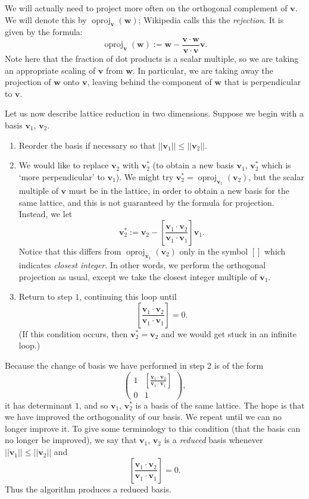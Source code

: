 \documentclass{article}
\theoremstyle{plain}
\theoremstyle{definition}
\theoremstyle{remark}
\numberwithin{theorem}{section}
\begin{document}
We will actually need to project more often on the orthogonal complement of $\mathbf{v}$.  We will denote this by $\operatorname{oproj}_\mathbf{v}(\mathbf{w})$; Wikipedia calls this the \emph{rejection}.  It is given by the formula:
\[
\operatorname{oproj}_\mathbf{v}(\mathbf{w}) := \mathbf{w} - \frac{ \mathbf{v} \cdot \mathbf{w} }{ \mathbf{v} \cdot \mathbf{v} } \mathbf{v}.
\]
Note here that the fraction of dot products is a scalar multiple, so we are taking an appropriate scaling of $\mathbf{v}$ from $\mathbf{w}$.  In particular, we are taking away the projection of $\mathbf{w}$ onto $\mathbf{v}$, leaving behind the component of $\mathbf{w}$ that is perpendicular to $\mathbf{v}$.

Let us now describe lattice reduction in two dimensions.  Suppose we begin with a basis $\mathbf{v}_1$, $\mathbf{v}_2$.
\begin{enumerate}
\item Reorder the basis if necessary so that $||\mathbf{v}_1|| \le ||\mathbf{v}_2||$.
\item We would like to replace $\mathbf{v}_2$ with $\mathbf{v}_2^*$ (to obtain a new basis $\mathbf{v}_1$, $\mathbf{v}_2^*$ which is `more perpendicular' to $\mathbf{v}_1$).  We might try $\mathbf{v}_2^* = \operatorname{oproj}_{\mathbf{v}_1}(\mathbf{v}_2)$, but the scalar multiple of $\mathbf{v}$ must be in the lattice, in order to obtain a new basis for the same lattice, and this is not guaranteed by the formula for projection.  Instead, we let
\[
\mathbf{v}_2^* := \mathbf{v}_2 - \left[ \frac{ \mathbf{v}_1 \cdot \mathbf{v}_2 }{ \mathbf{v}_1 \cdot \mathbf{v}_1 } \right] \mathbf{v}_1.
\]
Notice that this differs from $\operatorname{oproj}_{\mathbf{v}_1}(\mathbf{v}_2)$ only in the symbol $[]$ which indicates \emph{closest integer}.  In other words, we perform the orthogonal projection as usual, except we take the closest integer multiple of $\mathbf{v}_1$.
\item Return to step $1$, continuing this loop until
\[
\left[ \frac{ \mathbf{v}_1 \cdot \mathbf{v}_2 }{ \mathbf{v}_1 \cdot \mathbf{v}_1 } \right] = 0.
\]
(If this condition occurs, then $\mathbf{v}_2^* = \mathbf{v}_2$ and we would get stuck in an infinite loop.)
\end{enumerate}

Because the change of basis we have performed in step 2 is of the form
\[
\begin{pmatrix}
1 & \left[ \frac{ \mathbf{v}_1 \cdot \mathbf{v}_2 }{ \mathbf{v}_1 \cdot \mathbf{v}_1 } \right]  \\
0 & 1
\end{pmatrix},
\]
it has determinant $1$, and so $\mathbf{v}_1$, $\mathbf{v}_2^*$ is a basis of the same lattice.  The hope is that we have improved the orthogonality of our basis.  We repeat until we can no longer improve it.  To give some terminology to this condition (that the basis can no longer be improved), we say that $\mathbf{v}_1$, $\mathbf{v}_2$ is a \emph{reduced} basis whenever $||\mathbf{v}_1|| \le ||\mathbf{v}_2||$ and 
\[
\left[ \frac{ \mathbf{v}_1 \cdot \mathbf{v}_2 }{ \mathbf{v}_1 \cdot \mathbf{v}_1 } \right] = 0.
\]
Thus the algorithm produces a reduced basis.
\end{document}
